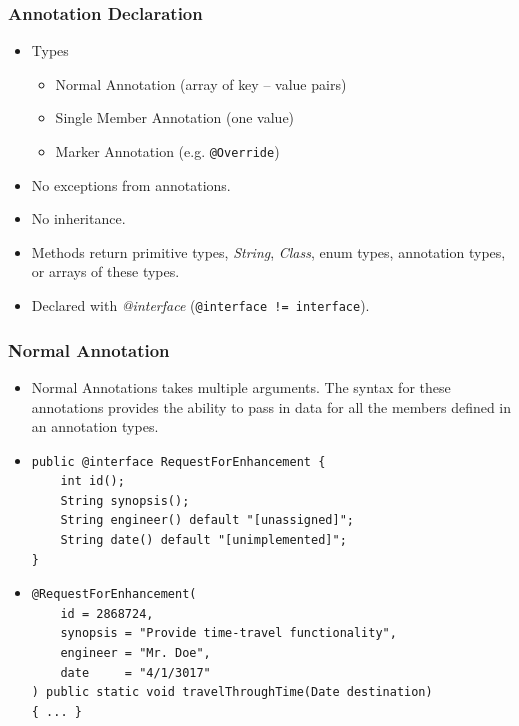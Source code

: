 \documentclass[10pt,xcolor=pdflatex]{beamer}
\begin{document}
\begin{frame}[containsverbatim]\frametitle{Annotation Declaration}
\begin{itemize}
	\item Types
	  \begin{itemize}
    	\item Normal Annotation (array of key -- value pairs)
		\item Single Member Annotation (one value)
		\item Marker Annotation (e.g. \texttt{@Override})
      \end{itemize}
	\item No exceptions from annotations.
	\item No inheritance.
	\item Methods return primitive types, \textit{String}, \textit{Class}, enum types, annotation types, or arrays of these types.
    \item Declared with \emph{@interface} (\texttt{@interface != interface}).
\end{itemize}
\end{frame}


\begin{frame}[containsverbatim]\frametitle{Normal Annotation}
\begin{itemize}
	\item Normal Annotations takes multiple arguments. The syntax for these annotations provides the ability to pass in data for all the members defined in an annotation types.
	\item[] \begin{footnotesize} \begin{verbatim}
public @interface RequestForEnhancement {
    int id();
    String synopsis();
    String engineer() default "[unassigned]";
    String date() default "[unimplemented]";   
}
	\end{verbatim} \end{footnotesize}
    
    \item[] \begin{footnotesize} \begin{verbatim}
@RequestForEnhancement(
    id = 2868724,
    synopsis = "Provide time-travel functionality",
    engineer = "Mr. Doe",
    date     = "4/1/3017"     
) public static void travelThroughTime(Date destination) 
{ ... }
    \end{verbatim} \end{footnotesize}
\end{itemize}
\end{frame}
\end{document}
